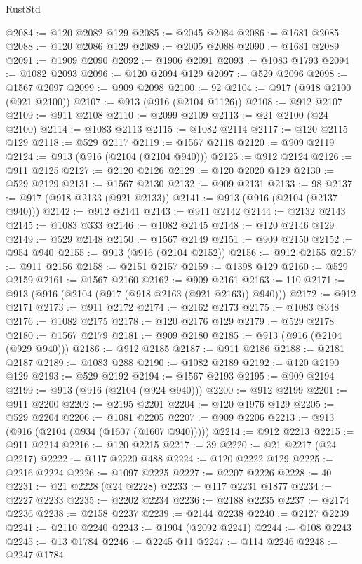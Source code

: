 \begin{lexlean}{RustStd}
\begin{coremodule}
@2084 := @120 @2082 @129
@2085 := @2045 @2084
@2086 := @1681 @2085
@2088 := @120 @2086 @129
@2089 := @2005 @2088
@2090 := @1681 @2089
@2091 := @1909 @2090
@2092 := @1906 @2091
@2093 := @1083 @1793
@2094 := @1082 @2093
@2096 := @120 @2094 @129
@2097 := @529 @2096
@2098 := @1567 @2097
@2099 := @909 @2098
@2100 := 92
@2104 := @917 (@918 @2100 (@921 @2100))
@2107 := @913 (@916 (@2104 @1126))
@2108 := @912 @2107
@2109 := @911 @2108
@2110 := @2099 @2109
@2113 := @21 @2100 (@24 @2100)
@2114 := @1083 @2113
@2115 := @1082 @2114
@2117 := @120 @2115 @129
@2118 := @529 @2117
@2119 := @1567 @2118
@2120 := @909 @2119
@2124 := @913 (@916 (@2104 (@2104 @940)))
@2125 := @912 @2124
@2126 := @911 @2125
@2127 := @2120 @2126
@2129 := @120 @2020 @129
@2130 := @529 @2129
@2131 := @1567 @2130
@2132 := @909 @2131
@2133 := 98
@2137 := @917 (@918 @2133 (@921 @2133))
@2141 := @913 (@916 (@2104 (@2137 @940)))
@2142 := @912 @2141
@2143 := @911 @2142
@2144 := @2132 @2143
@2145 := @1083 @333
@2146 := @1082 @2145
@2148 := @120 @2146 @129
@2149 := @529 @2148
@2150 := @1567 @2149
@2151 := @909 @2150
@2152 := @954 @940
@2155 := @913 (@916 (@2104 @2152))
@2156 := @912 @2155
@2157 := @911 @2156
@2158 := @2151 @2157
@2159 := @1398 @129
@2160 := @529 @2159
@2161 := @1567 @2160
@2162 := @909 @2161
@2163 := 110
@2171 := @913 (@916 (@2104 (@917 (@918 @2163 (@921 @2163)) @940)))
@2172 := @912 @2171
@2173 := @911 @2172
@2174 := @2162 @2173
@2175 := @1083 @348
@2176 := @1082 @2175
@2178 := @120 @2176 @129
@2179 := @529 @2178
@2180 := @1567 @2179
@2181 := @909 @2180
@2185 := @913 (@916 (@2104 (@929 @940)))
@2186 := @912 @2185
@2187 := @911 @2186
@2188 := @2181 @2187
@2189 := @1083 @288
@2190 := @1082 @2189
@2192 := @120 @2190 @129
@2193 := @529 @2192
@2194 := @1567 @2193
@2195 := @909 @2194
@2199 := @913 (@916 (@2104 (@924 @940)))
@2200 := @912 @2199
@2201 := @911 @2200
@2202 := @2195 @2201
@2204 := @120 @1976 @129
@2205 := @529 @2204
@2206 := @1081 @2205
@2207 := @909 @2206
@2213 := @913 (@916 (@2104 (@934 (@1607 (@1607 @940)))))
@2214 := @912 @2213
@2215 := @911 @2214
@2216 := @120 @2215
@2217 := 39
@2220 := @21 @2217 (@24 @2217)
@2222 := @117 @2220 @488
@2224 := @120 @2222 @129
@2225 := @2216 @2224
@2226 := @1097 @2225
@2227 := @2207 @2226
@2228 := 40
@2231 := @21 @2228 (@24 @2228)
@2233 := @117 @2231 @1877
@2234 := @2227 @2233
@2235 := @2202 @2234
@2236 := @2188 @2235
@2237 := @2174 @2236
@2238 := @2158 @2237
@2239 := @2144 @2238
@2240 := @2127 @2239
@2241 := @2110 @2240
@2243 := @1904 (@2092 @2241)
@2244 := @108 @2243
@2245 := @13 @1784
@2246 := @2245 @11
@2247 := @114 @2246
@2248 := @2247 @1784

\end{coremodule}
\end{lexlean}
